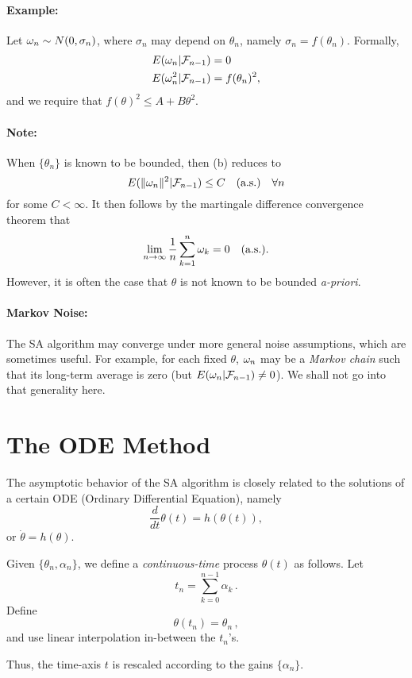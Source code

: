 \paragraph{Example:} Let $\omega_n \sim N(0,\sigma_n)$, where $\sigma_n$
may depend on $\theta_n$, namely $\sigma_n = f(\theta_n)$.  Formally,
\begin{align*}
E(\omega_n| \mathcal F_{n-1}) & = 0\\
E(\omega_n^2| \mathcal F_{n-1}) & = f(\theta_n)^2,
\end{align*}
and we require that $f(\theta)^2 \le A+B\theta^2$.

\paragraph{Note:}
When $\{\theta_n\}$ is known to be bounded, then (b) reduces to
$$
E(\| \omega_n\|^2 | \mathcal F_{n-1}) \le C  \quad \text{(a.s.)} \quad
\forall n
$$
for some $C<\infty$.
It then follows by the martingale difference convergence theorem that
$$
\lim_{n \to \infty} \frac{1}{n} \sum_{k=1}^n \omega_k = 0 \quad \text{(a.s.)}.
$$
However, it is often the case that $\theta$ is not known to be bounded
{\em a-priori}.


\paragraph{Markov Noise:}
The SA algorithm may converge under more general noise
assumptions, which are sometimes useful. For example, for each fixed $\theta$,
$\omega_n$ may be a {\em Markov chain} such that its long-term average is zero
(but $E(\omega_n|\mathcal F_{n-1}) \not= 0$). We shall not go into that generality here.

\section{The ODE Method}

The asymptotic behavior of the SA algorithm is closely related to the solutions
of a certain ODE (Ordinary Differential Equation), namely
$$
\frac{d}{dt}\theta(t)=h(\theta(t)),
$$
or $\dot{\theta}=h(\theta)$.

Given $\{\theta_n, \alpha_n\}$, we define a {\em continuous-time} process
$\theta(t)$ as follows.  Let
$$
t_n = \sum_{k=0}^{n-1} \alpha_k\,.
$$
Define
$$
\theta(t_n) = \theta_n\,,
$$
and use linear interpolation in-between the $t_n$'s.

Thus, the time-axis $t$ is rescaled according to the gains $\{\alpha_n\}$.

